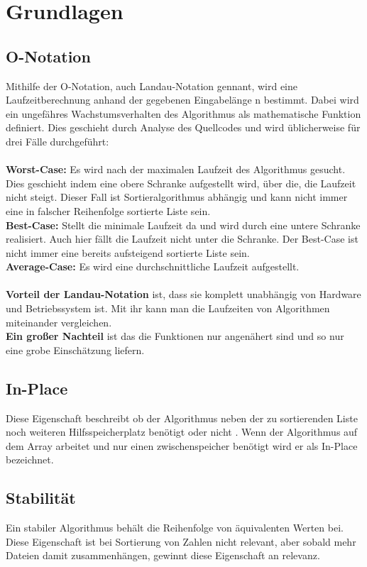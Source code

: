 \documentclass{article}
\begin{document}
\section{Grundlagen}
\subsection{O-Notation}
Mithilfe der O-Notation, auch Landau-Notation gennant, wird eine Laufzeitberechnung anhand der gegebenen Eingabelänge n bestimmt. Dabei wird ein ungefähres Wachstumsverhalten des Algorithmus als mathematische Funktion definiert. Dies geschieht durch Analyse des Quellcodes und wird üblicherweise für drei Fälle durchgeführt: \cite{monster2009buch,Rehn2006Sortieralgorithmen}\\ \\
\textbf {Worst-Case:} Es wird nach der maximalen Laufzeit des Algorithmus gesucht. Dies geschieht indem eine obere Schranke aufgestellt wird, über die, die Laufzeit nicht steigt. Dieser Fall ist Sortieralgorithmus abhängig und kann nicht immer eine in falscher Reihenfolge sortierte Liste sein.   \\
\textbf {Best-Case:} Stellt die minimale Laufzeit da und wird durch eine untere Schranke realisiert. Auch hier fällt die Laufzeit nicht unter die Schranke. Der Best-Case ist nicht immer eine bereits aufsteigend sortierte Liste sein.\\
\textbf {Average-Case:} Es wird eine durchschnittliche Laufzeit aufgestellt. \\ \\
\textbf{Vorteil der Landau-Notation} ist, dass sie komplett unabhängig von Hardware und Betriebssystem ist. Mit ihr kann man die Laufzeiten von Algorithmen miteinander vergleichen.\\
\textbf{Ein großer Nachteil} ist das die Funktionen nur angenähert sind und so nur eine grobe Einschätzung liefern.%

\subsection{In-Place}
Diese Eigenschaft beschreibt ob der Algorithmus neben der zu sortierenden Liste noch weiteren Hilfsspeicherplatz benötigt oder nicht \cite{India2015Dataset}. Wenn der Algorithmus auf dem Array arbeitet und nur einen zwischenspeicher benötigt wird er als In-Place bezeichnet. 
\subsection{Stabilität}
Ein stabiler Algorithmus behält die Reihenfolge von äquivalenten Werten bei. Diese Eigenschaft ist bei Sortierung von Zahlen nicht relevant, aber sobald mehr Dateien damit zusammenhängen, gewinnt diese Eigenschaft an relevanz. \cite{Rehn2006Sortieralgorithmen,India2015Dataset}
\end{document}
